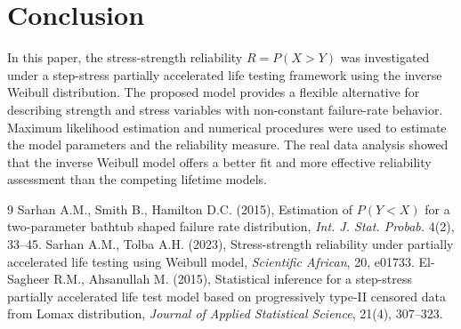 \documentclass[twoside]{article}
\begin{document}
\section{Conclusion}
\vspace{-0.5cm}
In this paper, the stress-strength reliability $R=P(X>Y)$ was investigated under a step-stress partially accelerated life testing framework using the inverse Weibull distribution. The proposed model provides a flexible alternative for describing strength and stress variables with non-constant failure-rate behavior. Maximum likelihood estimation and numerical procedures were used to estimate the model parameters and the reliability measure. The real data analysis showed that the inverse Weibull model offers a better fit and more effective reliability assessment than the competing lifetime models.
\vspace{-0.5cm}
\begin{thebibliography}{9}
	\vspace{-0.5cm}
Sarhan A.M., Smith B., Hamilton D.C. (2015), Estimation of $P(Y < X)$ for a two-parameter bathtub shaped failure rate distribution, {\it Int. J. Stat. Probab.} 4(2), 33–45.
\vspace{-0.5cm}
Sarhan A.M., Tolba A.H. (2023), Stress-strength reliability under partially accelerated life testing using Weibull model, {\it Scientific African}, 20, e01733.
\vspace{-0.5cm}
El-Sagheer R.M., Ahsanullah M. (2015), Statistical inference for a step-stress partially accelerated life test model based on progressively type-II censored data from Lomax distribution, {\it Journal of Applied Statistical Science}, 21(4), 307–323.
\end{thebibliography}
 
\end{document}
